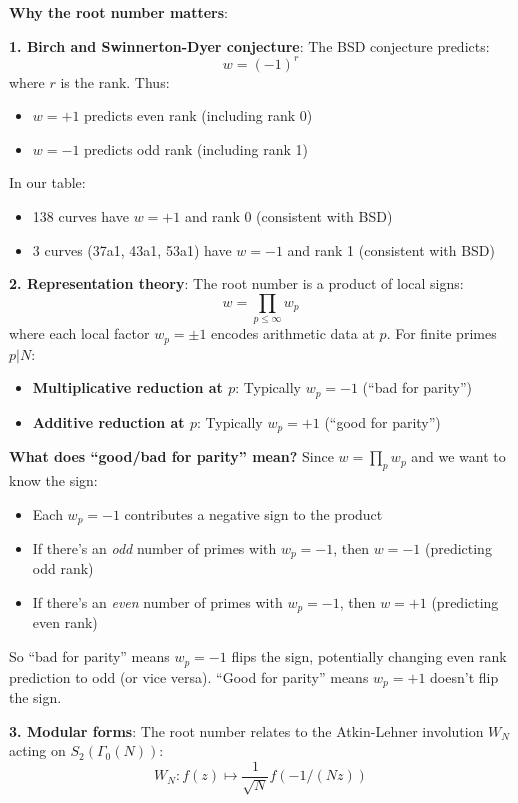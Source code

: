 \documentclass[11pt]{article}
\begin{document}
\textbf{Why the root number matters}:

\textbf{1. Birch and Swinnerton-Dyer conjecture}: The BSD conjecture predicts:
$$w = (-1)^{r}$$
where $r$ is the rank. Thus:
\begin{itemize}
\item $w = +1$ predicts even rank (including rank 0)
\item $w = -1$ predicts odd rank (including rank 1)
\end{itemize}

In our table:
\begin{itemize}
\item 138 curves have $w = +1$ and rank 0 (consistent with BSD)
\item 3 curves (37a1, 43a1, 53a1) have $w = -1$ and rank 1 (consistent with BSD)
\end{itemize}

\textbf{2. Representation theory}: The root number is a product of local signs:
$$w = \prod_{p \leq \infty} w_p$$
where each local factor $w_p = \pm 1$ encodes arithmetic data at $p$. For finite primes $p | N$:
\begin{itemize}
\item \textbf{Multiplicative reduction at $p$}: Typically $w_p = -1$ (``bad for parity'')
\item \textbf{Additive reduction at $p$}: Typically $w_p = +1$ (``good for parity'')
\end{itemize}

\textbf{What does ``good/bad for parity'' mean?} Since $w = \prod_p w_p$ and we want to know the sign:
\begin{itemize}
\item Each $w_p = -1$ contributes a negative sign to the product
\item If there's an \emph{odd} number of primes with $w_p = -1$, then $w = -1$ (predicting odd rank)
\item If there's an \emph{even} number of primes with $w_p = -1$, then $w = +1$ (predicting even rank)
\end{itemize}

So ``bad for parity'' means $w_p = -1$ flips the sign, potentially changing even rank prediction to odd (or vice versa). ``Good for parity'' means $w_p = +1$ doesn't flip the sign.

\textbf{3. Modular forms}: The root number relates to the Atkin-Lehner involution $W_N$ acting on $S_2(\Gamma_0(N))$:
$$W_N: f(z) \mapsto \frac{1}{\sqrt{N}} f(-1/(Nz))$$
\end{document}
